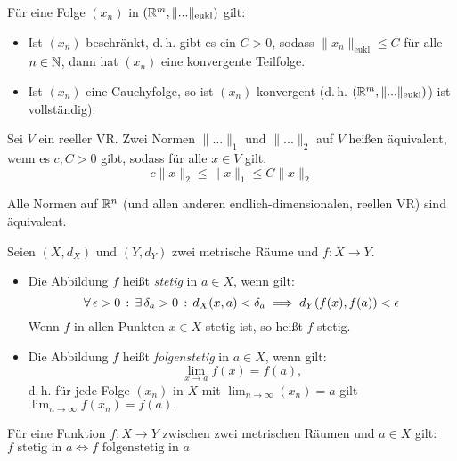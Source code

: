 \documentclass{cheat-sheet}
\begin{document}

\begin{satz}
Für eine Folge $(x_n)$ in $(\mathbb{R}^m, \| ... \|_{\text{eukl}})$ gilt:

\begin{itemize}
  \item Ist $(x_n)$ beschränkt, d.\,h. gibt es ein $C > 0$, sodass $\|x_n\|_{\text{eukl}} \le C$ für alle $n \in \mathbb{N}$, dann hat $(x_n)$ eine konvergente Teilfolge.
  \item Ist $(x_n)$ eine Cauchyfolge, so ist $(x_n)$ konvergent (d.\,h. $(\mathbb{R}^m, \| ... \|_{\text{eukl}})$) ist vollständig).
\end{itemize}
\end{satz}

\begin{defn}
Sei $V$ ein reeller VR. Zwei Normen $\| ... \|_1$ und $\| ... \|_2$ auf $V$ heißen äquivalent, wenn es $c, C > 0$ gibt, sodass für alle $x \in V$ gilt:
\[ c \| x \|_2 \le \| x \|_1 \le C \| x \|_2 \]
\end{defn}


\begin{satz}
Alle Normen auf $\mathbb{R}^n$ (und allen anderen endlich-dimensionalen, reellen VR) sind äquivalent.
\end{satz}

\begin{defn}
Seien $(X, d_X)$ und $(Y, d_Y)$ zwei metrische Räume und $f : X \to Y$.
\begin{itemize}
  \item Die Abbildung $f$ heißt \emph{stetig} in $a \in X$, wenn gilt:
  \[ \forall \, {\epsilon > 0} \,:\, \exists \, {\delta_a > 0} \,:\, d_X(x, a) < \delta_a \implies d_Y(f(x), f(a)) < \epsilon \]
  Wenn $f$ in allen Punkten $x \in X$ stetig ist, so heißt $f$ stetig.
  \item Die Abbildung $f$ heißt \emph{folgenstetig} in $a \in X$, wenn gilt:
  \[ \lim_{x \to a} f(x) = f(a), \]
  d.\,h. für jede Folge $(x_n)$ in $X$ mit $\lim_{n \to \infty} (x_n) = a$ gilt $\lim_{n \to \infty} f(x_n) = f(a).$
\end{itemize}
\end{defn}

\begin{satz}
Für eine Funktion $f : X \to Y$ zwischen zwei metrischen Räumen und $a \in X$ gilt:
$f \text{ stetig in } a \iff f \text{ folgenstetig in } a$
\end{satz}
\end{document}
